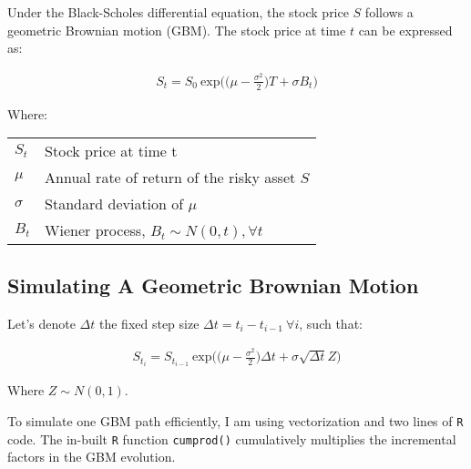 \documentclass[
  12pt,
]{article}
\begin{document}
Under the Black-Scholes differential equation, the stock price \(S\)
follows a geometric Brownian motion (GBM). The stock price at time \(t\)
can be expressed as:

\begin{align}
S_t = S_0 \: \text{exp}\bigg(\bigg({\mu - \frac{\sigma^2}{2}\bigg)T + \sigma B_t} \bigg)
\end{align}

\begin{footnotesize}
Where:

\begin{tabular}{ll}

$S_t$ & Stock price at time t\\
$\mu$ & Annual rate of return of the risky asset $S$\\
$\sigma$ & Standard deviation of $\mu$\\
$B_t$ & Wiener process, $B_t \sim N(0,t), \forall t$\\

\end{tabular}
\end{footnotesize}

\hypertarget{simulating-a-geometric-brownian-motion}{%
\subsection{Simulating A Geometric Brownian
Motion}\label{simulating-a-geometric-brownian-motion}}

Let's denote \(\Delta t\) the fixed step size
\(\Delta t = t_i - t_{i-1} \: \forall i\), such that:

\begin{align}
S_{t_i} = S_{t_{i-1}} \: \text{exp}\bigg(\bigg({\mu - \frac{\sigma^2}{2}\bigg)\Delta t + \sigma \sqrt{\Delta t} Z} \bigg)
\end{align}

Where \(Z \sim N(0,1)\).

To simulate one GBM path efficiently, I am using vectorization and two
lines of \texttt{R} code. The in-built \texttt{R} function
\texttt{cumprod()} cumulatively multiplies the incremental factors in
the GBM evolution.

\vspace{2mm}

\small
\end{document}
